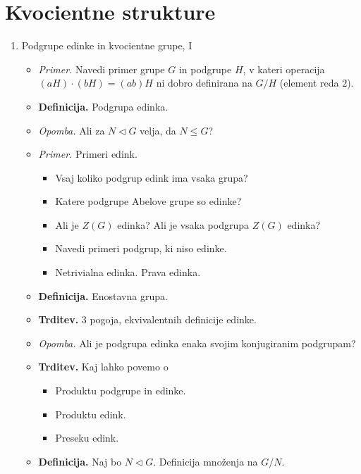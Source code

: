 \section{Kvocientne strukture}
\begin{enumerate}
    \item Podgrupe edinke in kvocientne grupe, I
    \begin{itemize}
        \item \colorbox{yellow!30}{\emph{Primer.}} Navedi primer grupe $G$ in podgrupe $H$, v kateri operacija $(aH) \cdot (bH) = (ab)H$ ni dobro definirana na $G/H$ (element reda $2$).
        \item \colorbox{purple!30}{\textbf{Definicija.}} Podgrupa edinka.
        \item \colorbox{yellow!30}{\emph{Opomba.}} Ali za $N \lhd G$ velja, da $N \leq G$?
        \item \colorbox{yellow!30}{\emph{Primer.}} Primeri edink.
        \begin{itemize}
            \item Vsaj koliko podgrup edink ima vsaka grupa?
            \item Katere podgrupe Abelove grupe so edinke?
            \item Ali je $Z(G)$ edinka? Ali je vsaka podgrupa $Z(G)$ edinka?
            \item Navedi primeri podgrup, ki niso edinke.
            \item Netrivialna edinka. Prava edinka.
        \end{itemize}
        \item \colorbox{purple!30}{\textbf{Definicija.}} Enostavna grupa.
        \item \colorbox{blue!30}{\textbf{Trditev.}} 3 pogoja, ekvivalentnih definicije edinke.
        \item \colorbox{yellow!30}{\emph{Opomba.}} Ali je podgrupa edinka enaka svojim konjugiranim podgrupam?
        \item \colorbox{blue!30}{\textbf{Trditev.}} Kaj lahko povemo o
        \begin{itemize}
            \item Produktu podgrupe in edinke.
            \item Produktu edink.
            \item Preseku edink.
        \end{itemize}
        \item \colorbox{purple!30}{\textbf{Definicija.}} Naj bo $N \lhd G$. Definicija množenja na $G/N$.

\end{itemize}
\end{enumerate}
